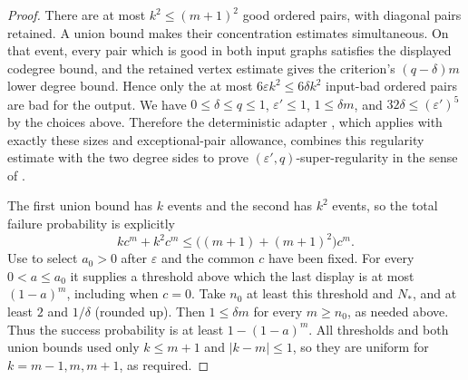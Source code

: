 \begin{proof}
There are at most $k^2\leq(m+1)^2$ good ordered pairs, with diagonal pairs
retained. A union bound makes their concentration estimates simultaneous. On that event, every pair
which is good in both input graphs satisfies the displayed codegree bound,
and the retained vertex estimate gives the criterion's $(q-\delta)m$ lower
degree bound.  Hence only the at most $6\varepsilon k^2\leq6\delta k^2$
input-bad ordered pairs are bad for the output.  We have
$0\leq\delta\leq q\leq1$, $\varepsilon'\leq1$, $1\leq\delta m$, and
$32\delta\leq(\varepsilon')^5$ by the choices above. Therefore the
deterministic adapter ,
which applies  with
exactly these sizes and exceptional-pair allowance, combines this regularity
estimate with the two degree sides to prove $(\varepsilon',q)$-super-regularity
in the sense of .

The first union bound has $k$ events and the second has $k^2$ events, so the
total failure probability is explicitly
\[
 kc^m+k^2c^m\leq\bigl((m+1)+(m+1)^2\bigr)c^m.
\]
Use  to select $a_0>0$
after $\varepsilon$ and the common $c$ have been fixed. For every
$0<a\leq a_0$ it supplies a threshold above which the last display is
at most $(1-a)^m$, including when $c=0$. Take $n_0$ at least this
threshold and $N_*$, and at least $2$ and $1/\delta$ (rounded up).
Then $1\leq\delta m$ for every $m\geq n_0$, as needed above.
Thus the success probability is at least $1-(1-a)^m$.
All thresholds and both union bounds used only
$k\leq m+1$ and $|k-m|\leq1$, so they are uniform for
$k=m-1,m,m+1$, as required.
\end{proof}
